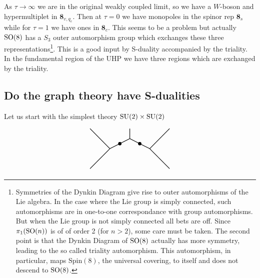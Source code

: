 As $\tau\rightarrow\infty$ we are in the original weakly coupled limit, so we have a $W$-boson and hypermultiplet in $\mathbf{8}_{v,q_{e}}$. Then at $\tau=0$ we have monopoles in the spinor rep $\mathbf{8}_{s}$ while for $\tau=1$ we have ones in $\mathbf{8}_{c}$. This seems to be a problem but actually $\mathrm{SO}(8)$ has a $S_{3}$ outer automorphism group which exchanges these three representations\footnote{Symmetries of the Dynkin Diagram give rise to outer automorphisms of the Lie algebra. In the case where the Lie group is simply connected, such automorphisms are in one-to-one correspondance with group automorphisms. But when the Lie group is not simply connected all bets are off. Since $\pi_{1}(\mathrm{SO}(n))$ is of of order 2 (for $n>2$), some care must be taken. The second point is that the Dynkin Diagram of $\mathrm{SO}(8)$ actually has more symmetry, leading to the so called triality automorphism. This automorphism, in particular, maps $\text{Spin}(8)$, the universal covering, to itself and does not descend to $\mathrm{SO}(8)$.}. This is a good input by S-duality accompanied by the triality. In the fundamental region of the UHP we have three regions which are exchanged by the triality.

\subsection{Do the graph theory have S-dualities}
Let us start with the simplest theory $\mathrm{SU}(2)\times\mathrm{SU}(2)$

\begin{equation}
\begin{tikzpicture}[thick]
  \draw[-](0,0)--(1,-1);
  \draw[-](1,-1)--(0,-2);
  \draw[-](1,-1)--(2,-0.5);
  \draw[-](2,-0.5)--(2,0);
  \draw[-](2,-0.5)--(3,-1);
  \draw[-](3,-1)--(4,-2);
  \draw[-](3,-1)--(4,0);
  \filldraw[black] (1.5,-0.75) circle (2pt) node[]{};
  \filldraw[black] (2.5,-0.75) circle (2pt) node[]{};
\end{tikzpicture}
\end{equation}

